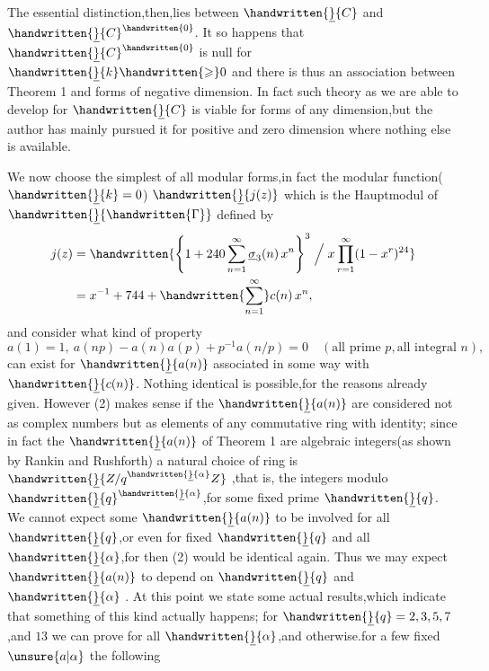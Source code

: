 The essential distinction,then,lies between $\handwritten{\underline}{C}$ and $\handwritten{\underline}{C}^{\handwritten{0}}$. It so happens that $\handwritten{\underline}{C}^{\handwritten{0}}$ is null for $\handwritten{\underline}{k}\handwritten{\geqslant}0$ and there is thus an association between Theorem 1 and forms of negative dimension. In fact such theory as we are able to develop for $\handwritten{\underline}{C}$ is viable for forms of any dimension,but the author has mainly pursued it for positive and zero dimension where nothing else is available.

We now choose the simplest of all modular forms,in fact the modular function($\handwritten{\underline}{k}=0$) $\handwritten{\underline}{j(z)}$ which is the Hauptmodul of $\handwritten{\underline}{\handwritten{\Gamma}}$ defined by
\[
\begin{aligned}
j(z)&=\handwritten{\left\{1+240\sum_{n=1}^{\infty}\underline{\sigma}_{3}(n)\,x^n\right\}^{3}\Bigm/ x\prod_{r=1}^{\infty}(1-x^{r})^{24}}\\
&=x^{-1}+744+\handwritten{\sum_{n=1}^{\infty}}c(n)\,x^n,
\end{aligned}
\]
\reversemarginpar{}\normalmarginpar
and consider what kind of property
\[
a(1)=1,\ a(np)-a(n)a(p)+p^{-1}a(n/p)=0\quad (\text{all prime }p,\text{all integral }n),
\tag*{(2)}
\]
can exist for $\handwritten{\underline}{a(n)}$ associated in some way with $\handwritten{\underline}{c(n)}$. Nothing identical is possible,for the reasons already given. However (2) makes sense if the $\handwritten{\underline}{a(n)}$ are considered not as complex numbers but as elements of any commutative ring with identity; since in fact the $\handwritten{\underline}{a(n)}$ of Theorem 1 are algebraic integers(as shown by Rankin and Rushforth) a natural choice of ring is $\handwritten{\underline}{Z/q^{\handwritten{\underline}{\alpha}}Z}$ ,that is, the integers modulo $\handwritten{\underline}{q}^{\handwritten{\underline}{\alpha}}$,for some fixed prime $\handwritten{\underline}{q}$. We cannot expect some  $\handwritten{\underline}{a(n)}$ to be involved for all $\handwritten{\underline}{q}$,or even for fixed $\handwritten{\underline}{q}$ and all $\handwritten{\underline}{\alpha}$,for then (2) would be identical again. Thus we may expect $\handwritten{\underline}{a(n)}$ to depend on $\handwritten{\underline}{q}$ and $\handwritten{\underline}{\alpha}$ . At this point we  state some actual results,which indicate that something of this kind actually happens; for $\handwritten{\underline}{q}=2,3,5,7$,and $13$ we can prove for all $\handwritten{\underline}{\alpha}$,and otherwise.for a few fixed $\unsure{a|\alpha}$ the following

